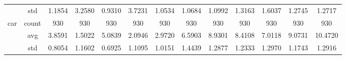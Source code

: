 \begin{table}[htbp]
{\begin{tabular}{rcccccccccccc}
			                                   & std                                    & 1.1854                                                                             & 3.2580                                                                    & 0.9310                                                                    & 3.7231                                                                    & 1.0534                                        & 1.0684                                      & 1.0992                                         & 1.3163                                         & 1.6037                                         & 1.2745                                         & 1.2717                                         \\
			car                                & count                                  & 930                                                                                & 930                                                                       & 930                                                                       & 930                                                                       & 930                                           & 930                                         & 930                                            & 930                                            & 930                                            & 930                                            & 930                                            \\
			                                   & avg                                    & 3.8591                                                                             & \cellcolor[rgb]{ .776,  .937,  .808}\textcolor[rgb]{ 0,  .38,  0}{1.5022} & 5.0839                                                                    & 2.0946                                                                    & 2.9720                                        & 6.5903                                      & 8.9301                                         & 8.4108                                         & 7.0118                                         & 9.0731                                         & 10.4720                                        \\
			                                   & std                                    & 0.8054                                                                             & 1.1602                                                                    & 0.6925                                                                    & 1.1095                                                                    & 1.0151                                        & 1.4439                                      & 1.2877                                         & 1.2333                                         & 1.2970                                         & 1.1743                                         & 1.2916                                         \\

\end{tabular}}
\end{table}
